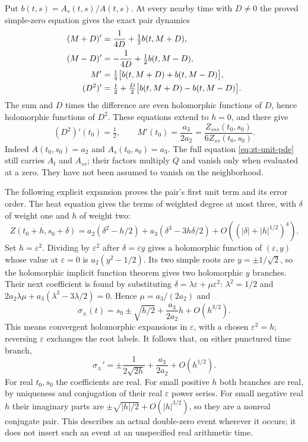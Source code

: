 Put $b(t,s)=A_s(t,s)/A(t,s)$.  At every nearby time with $D\ne0$
the proved simple-zero equation gives the exact pair dynamics
\begin{align}
 (M+D)'&=\frac1{4D}+\tfrac12 b(t,M+D),\notag\\
 (M-D)'&=-\frac1{4D}+\tfrac12 b(t,M-D),\notag\\
 M'&=\tfrac14\bigl[b(t,M+D)+b(t,M-D)\bigr],\notag\\
 (D^2)'&=\tfrac12+\tfrac D2
              \bigl[b(t,M+D)-b(t,M-D)\bigr].
 \label{eq:zt-double-exact}
\end{align}
The sum and $D$ times the difference are even holomorphic functions
of $D$, hence holomorphic functions of $D^2$.  These equations extend
to $h=0$, and there give
\[
 (D^2)'(t_0)=\tfrac12,\qquad
 M'(t_0)=\frac{a_3}{2a_2}
        =\frac{Z_{sss}(t_0,s_0)}{6Z_{ss}(t_0,s_0)}.
\]
Indeed $A(t_0,s_0)=a_2$ and $A_s(t_0,s_0)=a_3$.
The full equation \eqref{eq:zt-unit-pde} still carries $A_t$ and
$A_{ss}$; their factors multiply $Q$ and vanish only when evaluated
at a zero.  They have not been assumed to vanish on the neighborhood.

The following explicit expansion proves the pair's first unit term
and its error order.  The heat equation gives the terms of weighted
degree at most three, with $\delta$ of weight one and $h$ of weight
two:
\[
 Z(t_0+h,s_0+\delta)
 =a_2(\delta^2-h/2)+a_3(\delta^3-3h\delta/2)
       +O((|\delta|+|h|^{1/2})^4).
\]
Set $h=\varepsilon^2$.  Dividing by $\varepsilon^2$ after
$\delta=\varepsilon y$ gives a holomorphic function of
$(\varepsilon,y)$ whose value at $\varepsilon=0$ is
$a_2(y^2-1/2)$.  Its two simple roots are
$y=\pm1/\sqrt2$, so the holomorphic implicit function theorem
gives two holomorphic $y$ branches.  Their next coefficient is found
by substituting $\delta=\lambda\varepsilon+\mu\varepsilon^2$:
$\lambda^2=1/2$ and
$2a_2\lambda\mu+a_3(\lambda^3-3\lambda/2)=0$.
Hence $\mu=a_3/(2a_2)$ and
\begin{equation}
 \sigma_\pm(t)=s_0\mathbin\pm\sqrt{h/2}
             +\frac{a_3}{2a_2}h+O(h^{3/2}).
 \label{eq:zt-double-expansion}
\end{equation}
This means convergent holomorphic expansions in $\varepsilon$,
with a chosen $\varepsilon^2=h$; reversing $\varepsilon$ exchanges
the root labels.  It follows that, on either punctured time branch,
\[
 \sigma_\pm'=\mathbin\pm\frac1{2\sqrt{2h}}
                 +\frac{a_3}{2a_2}+O(h^{1/2}).
\]
For real $t_0,s_0$ the coefficients are real.  For small positive
$h$ both branches are real, by uniqueness and conjugation of their
real $\varepsilon$ power series.  For small negative real $h$ their
imaginary parts are $\pm\sqrt{|h|/2}+O(|h|^{3/2})$, so they are a
nonreal conjugate pair.  This describes an actual double-zero event
wherever it occurs; it does not insert such an event at an unspecified
real arithmetic time.

